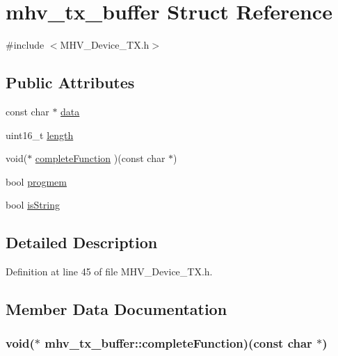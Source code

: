 \hypertarget{structmhv__tx__buffer}{
\section{mhv\-\_\-tx\-\_\-buffer \-Struct \-Reference}
\label{structmhv__tx__buffer}
}


{\ttfamily \#include $<$\-M\-H\-V\-\_\-\-Device\-\_\-\-T\-X.\-h$>$}

\subsection*{\-Public \-Attributes}
\begin{DoxyCompactItemize}
\item 
const char $\ast$ \hyperlink{structmhv__tx__buffer_a7523481b7a0b1d4972a79a4de6e528af}{data}
\item 
uint16\-\_\-t \hyperlink{structmhv__tx__buffer_ac05ef0da2f6fce474bec691e8e1fb4e2}{length}
\item 
void($\ast$ \hyperlink{structmhv__tx__buffer_a1a50cf4d4aba22fe7d519832fa1d61ff}{complete\-Function} )(const char $\ast$)
\item 
bool \hyperlink{structmhv__tx__buffer_a0b9b692bdd3d83c9a53e19a5c951fb74}{progmem}
\item 
bool \hyperlink{structmhv__tx__buffer_a945fe73e41c397f3c4f7765c97469a35}{is\-String}
\end{DoxyCompactItemize}


\subsection{\-Detailed \-Description}


\-Definition at line 45 of file \-M\-H\-V\-\_\-\-Device\-\_\-\-T\-X.\-h.



\subsection{\-Member \-Data \-Documentation}
\hypertarget{structmhv__tx__buffer_a1a50cf4d4aba22fe7d519832fa1d61ff}{
\subsubsection[{complete\-Function}]{\setlength{\rightskip}{0pt plus 5cm}void($\ast$ {\bf mhv\-\_\-tx\-\_\-buffer\-::complete\-Function})(const char $\ast$)}}
\label{structmhv__tx__buffer_a1a50cf4d4aba22fe7d519832fa1d61ff}


